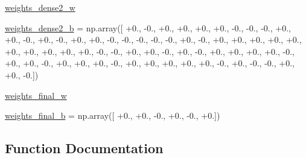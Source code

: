 \begin{DoxyCompactItemize}
\item 
\hyperlink{namespacepybullet-gym_1_1pybulletgym_1_1examples_1_1roboschool-weights_1_1enjoy___t_f___half_cheetah_py_bullet_env__v0__2017may_a19516837c8d203f49a25a00feb1d31e7}{weights\+\_\+dense2\+\_\+w}
\item 
\hyperlink{namespacepybullet-gym_1_1pybulletgym_1_1examples_1_1roboschool-weights_1_1enjoy___t_f___half_cheetah_py_bullet_env__v0__2017may_ad62018e23a541131aeaa41573c83bcaa}{weights\+\_\+dense2\+\_\+b} = np.\+array(\mbox{[} +0., -\/0., +0., +0., +0., +0., -\/0., -\/0., -\/0., +0., +0., -\/0., +0., -\/0., +0., +0., -\/0., -\/0., -\/0., -\/0., -\/0., +0., -\/0., +0., +0., +0., +0., +0., +0., +0., +0., +0., +0., -\/0., -\/0., +0., +0., -\/0., +0., -\/0., +0., +0., +0., +0., -\/0., +0., +0., -\/0., +0., +0., +0., -\/0., +0., +0., +0., +0., +0., -\/0., +0., -\/0., -\/0., +0., +0., -\/0.\mbox{]})
\item 
\hyperlink{namespacepybullet-gym_1_1pybulletgym_1_1examples_1_1roboschool-weights_1_1enjoy___t_f___half_cheetah_py_bullet_env__v0__2017may_a8f77699bfcdb561c965b36fa1a9901b2}{weights\+\_\+final\+\_\+w}
\item 
\hyperlink{namespacepybullet-gym_1_1pybulletgym_1_1examples_1_1roboschool-weights_1_1enjoy___t_f___half_cheetah_py_bullet_env__v0__2017may_af017b614a401a0d7a9bd36c24cab34a1}{weights\+\_\+final\+\_\+b} = np.\+array(\mbox{[} +0., +0., -\/0., +0., -\/0., +0.\mbox{]})
\end{DoxyCompactItemize}


\subsection{Function Documentation}
